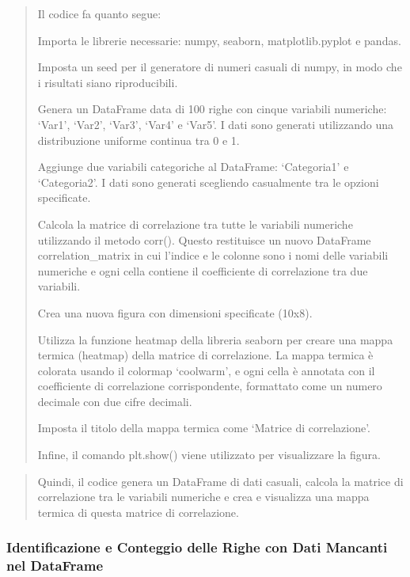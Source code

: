 \documentclass[11pt]{article}
\begin{document}
    \begin{quote}
Il codice fa quanto segue:

Importa le librerie necessarie: numpy, seaborn, matplotlib.pyplot e
pandas.

Imposta un seed per il generatore di numeri casuali di numpy, in modo
che i risultati siano riproducibili.

Genera un DataFrame data di 100 righe con cinque variabili numeriche:
`Var1', `Var2', `Var3', `Var4' e `Var5'. I dati sono generati
utilizzando una distribuzione uniforme continua tra 0 e 1.

Aggiunge due variabili categoriche al DataFrame: `Categoria1' e
`Categoria2'. I dati sono generati scegliendo casualmente tra le opzioni
specificate.

Calcola la matrice di correlazione tra tutte le variabili numeriche
utilizzando il metodo corr(). Questo restituisce un nuovo DataFrame
correlation\_matrix in cui l'indice e le colonne sono i nomi delle
variabili numeriche e ogni cella contiene il coefficiente di
correlazione tra due variabili.

Crea una nuova figura con dimensioni specificate (10x8).

Utilizza la funzione heatmap della libreria seaborn per creare una mappa
termica (heatmap) della matrice di correlazione. La mappa termica è
colorata usando il colormap `coolwarm', e ogni cella è annotata con il
coefficiente di correlazione corrispondente, formattato come un numero
decimale con due cifre decimali.

Imposta il titolo della mappa termica come `Matrice di correlazione'.

Infine, il comando plt.show() viene utilizzato per visualizzare la
figura.
\end{quote}

\begin{quote}
Quindi, il codice genera un DataFrame di dati casuali, calcola la
matrice di correlazione tra le variabili numeriche e crea e visualizza
una mappa termica di questa matrice di correlazione.
\end{quote}

    \subsubsection{Identificazione e Conteggio delle Righe con Dati Mancanti
nel
DataFrame}\label{identificazione-e-conteggio-delle-righe-con-dati-mancanti-nel-dataframe}
\end{document}
